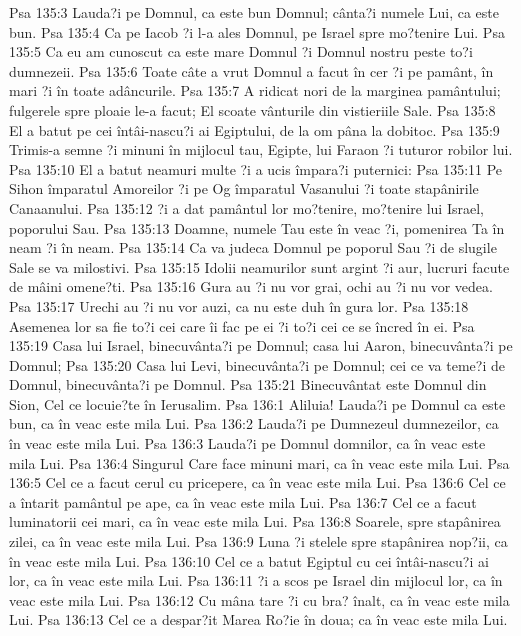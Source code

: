 Psa 135:3  Lauda?i pe Domnul, ca este bun Domnul; cânta?i numele Lui, ca este bun.
Psa 135:4  Ca pe Iacob ?i l-a ales Domnul, pe Israel spre mo?tenire Lui.
Psa 135:5  Ca eu am cunoscut ca este mare Domnul ?i Domnul nostru peste to?i dumnezeii.
Psa 135:6  Toate câte a vrut Domnul a facut în cer ?i pe pamânt, în mari ?i în toate adâncurile.
Psa 135:7  A ridicat nori de la marginea pamântului; fulgerele spre ploaie le-a facut; El scoate vânturile din vistieriile Sale.
Psa 135:8  El a batut pe cei întâi-nascu?i ai Egiptului, de la om pâna la dobitoc.
Psa 135:9  Trimis-a semne ?i minuni în mijlocul tau, Egipte, lui Faraon ?i tuturor robilor lui.
Psa 135:10  El a batut neamuri multe ?i a ucis împara?i puternici:
Psa 135:11  Pe Sihon împaratul Amoreilor ?i pe Og împaratul Vasanului ?i toate stapânirile Canaanului.
Psa 135:12  ?i a dat pamântul lor mo?tenire, mo?tenire lui Israel, poporului Sau.
Psa 135:13  Doamne, numele Tau este în veac ?i, pomenirea Ta în neam ?i în neam.
Psa 135:14  Ca va judeca Domnul pe poporul Sau ?i de slugile Sale se va milostivi.
Psa 135:15  Idolii neamurilor sunt argint ?i aur, lucruri facute de mâini omene?ti.
Psa 135:16  Gura au ?i nu vor grai, ochi au ?i nu vor vedea.
Psa 135:17  Urechi au ?i nu vor auzi, ca nu este duh în gura lor.
Psa 135:18  Asemenea lor sa fie to?i cei care îi fac pe ei ?i to?i cei ce se încred în ei.
Psa 135:19  Casa lui Israel, binecuvânta?i pe Domnul; casa lui Aaron, binecuvânta?i pe Domnul;
Psa 135:20  Casa lui Levi, binecuvânta?i pe Domnul; cei ce va teme?i de Domnul, binecuvânta?i pe Domnul.
Psa 135:21  Binecuvântat este Domnul din Sion, Cel ce locuie?te în Ierusalim.
Psa 136:1  Aliluia! Lauda?i pe Domnul ca este bun, ca în veac este mila Lui.
Psa 136:2  Lauda?i pe Dumnezeul dumnezeilor, ca în veac este mila Lui.
Psa 136:3  Lauda?i pe Domnul domnilor, ca în veac este mila Lui.
Psa 136:4  Singurul Care face minuni mari, ca în veac este mila Lui.
Psa 136:5  Cel ce a facut cerul cu pricepere, ca în veac este mila Lui.
Psa 136:6  Cel ce a întarit pamântul pe ape, ca în veac este mila Lui.
Psa 136:7  Cel ce a facut luminatorii cei mari, ca în veac este mila Lui.
Psa 136:8  Soarele, spre stapânirea zilei, ca în veac este mila Lui.
Psa 136:9  Luna ?i stelele spre stapânirea nop?ii, ca în veac este mila Lui.
Psa 136:10  Cel ce a batut Egiptul cu cei întâi-nascu?i ai lor, ca în veac este mila Lui.
Psa 136:11  ?i a scos pe Israel din mijlocul lor, ca în veac este mila Lui.
Psa 136:12  Cu mâna tare ?i cu bra? înalt, ca în veac este mila Lui.
Psa 136:13  Cel ce a despar?it Marea Ro?ie în doua; ca în veac este mila Lui.
